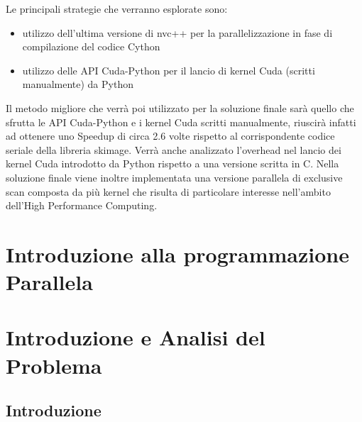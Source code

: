 \documentclass[12pt,a4paper]{report}
\begin{document}
Le principali strategie che verranno esplorate sono:
\begin{itemize}
\item utilizzo dell'ultima versione di nvc++ per la parallelizzazione in fase di compilazione del codice Cython
\item utilizzo delle API Cuda-Python per il lancio di kernel Cuda (scritti manualmente) da Python 
\end{itemize}
Il metodo migliore che verrà poi utilizzato per la soluzione finale sarà quello che sfrutta le API Cuda-Python e i kernel Cuda scritti manualmente, riuscirà infatti ad ottenere uno Speedup di circa 2.6 volte %
 rispetto al corrispondente codice seriale della libreria skimage. Verrà anche analizzato l'overhead nel lancio dei kernel Cuda introdotto da Python rispetto a una versione scritta in C. \newline
Nella soluzione finale viene inoltre implementata una versione parallela di exclusive scan composta da più kernel che risulta di particolare interesse nell'ambito dell'High Performance Computing.

\chapter{Introduzione alla programmazione Parallela}


\chapter{Introduzione e Analisi del Problema}
\section{Introduzione}
\end{document}
